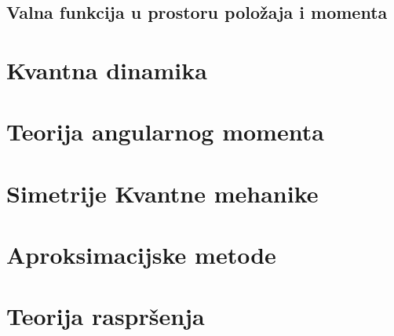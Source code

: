 \documentclass{article}
\numberwithin{equation}{section}
\begin{document}
\subsection{Valna funkcija u prostoru položaja i momenta}




\section{Kvantna dinamika}

\section{Teorija angularnog momenta}

\section{Simetrije Kvantne mehanike}

\section{Aproksimacijske metode}

\section{Teorija raspršenja}
\end{document}
